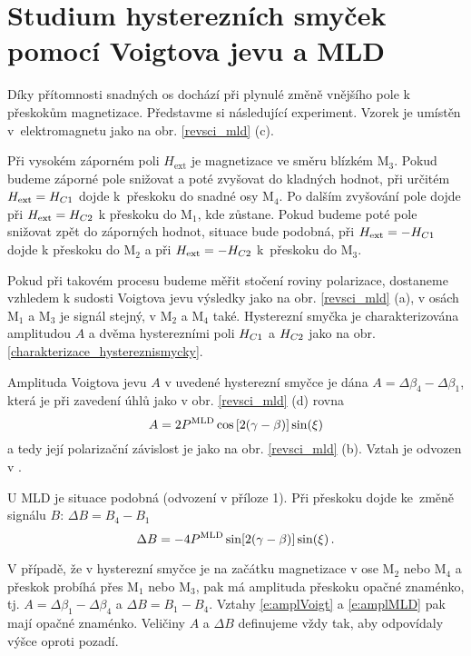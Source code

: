 \section{Studium hysterezních smyček pomocí Voigtova jevu a MLD}

Díky přítomnosti snadných os dochází při plynulé změně vnějšího pole k přeskokům magnetizace. Představme si následující experiment.
Vzorek je umístěn v~elektromagnetu jako na obr. \ref{revsci_mld} (c).


Při vysokém záporném poli $H_\text{ext}$ je magnetizace ve směru blízkém M$_3$. Pokud budeme záporné pole snižovat a poté zvyšovat do kladných hodnot, při určitém $H_\text{ext}=H_{C1}$ dojde k~přeskoku do snadné osy M$_4$. Po dalším zvyšování pole dojde při $H_\text{ext}=H_{C2}$ k přeskoku do M$_1$, kde zůstane. Pokud budeme poté pole snižovat zpět do záporných hodnot, situace bude podobná, při $H_\text{ext}=-H_{C1}$ dojde k přeskoku do M$_2$ a při $H_\text{ext}=-H_{C2}$ k~přeskoku do M$_3$.

Pokud při takovém procesu budeme měřit stočení roviny polarizace, dostaneme vzhledem k sudosti Voigtova jevu výsledky jako na obr. \ref{revsci_mld} (a), v osách M$_1$ a M$_3$ je signál stejný, v M$_2$ a M$_4$ také.
Hysterezní smyčka je charakterizována amplitudou $A$ a dvěma hysterezními poli $H_{C1}$ a $H_{C2}$ jako na obr. \ref{charakterizace_hystereznismycky}.

Amplituda Voigtova jevu $A$ v uvedené hysterezní smyčce je dána $A=\Delta \beta_4 - \Delta \beta_1$, která je při zavedení úhlů jako v obr. \ref{revsci_mld} (d) rovna \cite{Tesarova}
\begin{equation} \label{e:amplVoigt}
A =2 P^{\text{MLD}} \cos\left[2(\gamma-\beta)\right] \sin(\xi)
\end{equation}
a tedy její polarizační závislost je jako na obr. \ref{revsci_mld} (b). Vztah je odvozen v \cite{Reichlova}.

U MLD je situace podobná (odvození v příloze 1).
Při přeskoku dojde ke~změně signálu $B$: $\Delta B=B_4-B_1$
\begin{equation} \label{e:amplMLD}
\Delta B=-4P^{\text{MLD}}  \sin[2(\gamma-\beta)]\sin(\xi) \,.
\end{equation}

V případě, že v hysterezní smyčce je na začátku magnetizace v ose M$_2$ nebo M$_4$ a přeskok probíhá přes M$_1$ nebo M$_3$, pak má amplituda přeskoku opačné znaménko, tj. $A=\Delta \beta_1 - \Delta \beta_4$ a $\Delta B=B_1-B_4$. Vztahy \eqref{e:amplVoigt} a \eqref{e:amplMLD} pak mají opačné znaménko. Veličiny $A$ a $\Delta B$ definujeme vždy tak, aby odpovídaly výšce  oproti pozadí.

